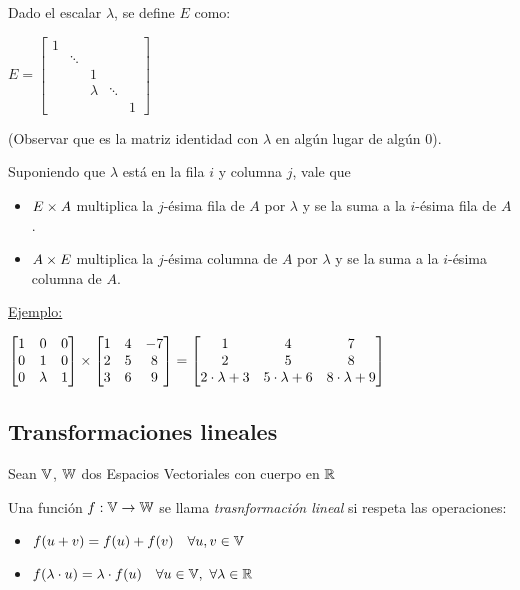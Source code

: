 Dado el escalar $\lambda$, se define $E$ como:
\begin{center}
	$E = \begin{bmatrix}
		1 & & & & \\
		& \ddots & & & \\
		& & 1 & & \\
		& & \lambda & \ddots & \\
		& & & & 1
	\end{bmatrix}$
\end{center}

(Observar que es la matriz identidad con $\lambda$ en algún lugar de algún $0$).

Suponiendo que $\lambda$ está en la fila $i$ y columna $j$, vale que
\begin{itemize}
	\item $E \times A$ multiplica la $j$-ésima fila de $A$ por $\lambda$ y se la suma a la $i$-ésima fila de $A$.
	\item $A \times E$ multiplica la $j$-ésima columna de $A$ por $\lambda$ y se la suma a la $i$-ésima columna de $A$.
\end{itemize}

\underline{Ejemplo:}
\begin{center}
	$\begin{bmatrix}
		1&0&0\\
		0&1&0\\
		0&\lambda&1
	\end{bmatrix}\times
	\begin{bmatrix}
		1&4&-7\\
		2&5&8\\
		3&6&9
	\end{bmatrix} =
	\begin{bmatrix}
		1&4&7\\
		2&5&8\\
		2\cdot\lambda+3 & 5\cdot\lambda + 6 & 8\cdot\lambda +9
	\end{bmatrix}$
\end{center}

\subsection{Transformaciones lineales}
Sean $\mathbb{V}$, $\mathbb{W}$ dos Espacios Vectoriales con cuerpo en $\mathbb{R}$
\begin{defi}
	Una función $f: \mathbb{V} \to \mathbb{W}$ se llama \textit{trasnformación lineal} si respeta
	las operaciones:
	\begin{itemize}
		\item $f(u + v) = f(u) + f(v) \quad \forall u,v \in \mathbb{V}$
		\item $f(\lambda \cdot u) = \lambda \cdot f(u) \quad \forall u \in \mathbb{V},\ \forall \lambda \in \mathbb{R}$
	\end{itemize}
\end{defi}

